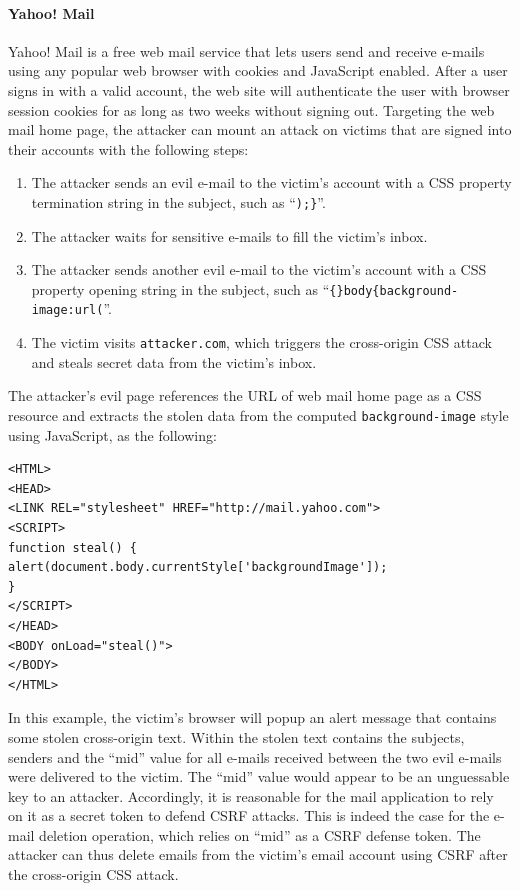 \documentclass{acm_proc_article-sp}
\begin{document}
\paragraph{Yahoo! Mail} Yahoo! Mail is a free web mail service that lets users send and receive e-mails using any popular web browser with cookies and JavaScript enabled. After a user signs in with a valid account, the web site will authenticate the user with browser session cookies for as long as two weeks without signing out. Targeting the web mail home page, the attacker can mount an attack on victims that are signed into their accounts with the following steps:
\begin{enumerate}
\item{The attacker sends an evil e-mail to the victim's account with a CSS property termination string in the subject, such as ``\texttt{);\}}''.}
\item{The attacker waits for sensitive e-mails to fill the victim's inbox.}
\item{The attacker sends another evil e-mail to the victim's account with a CSS property opening string in the subject, such as ``\texttt{\{\}body\{background-image:url(}''.}
\item{The victim visits \texttt{attacker.com}, which triggers the cross-origin CSS attack and steals secret data from the victim's inbox.}
\end{enumerate}
The attacker's evil page references the URL of web mail home page as a CSS resource and extracts the stolen data from the computed \texttt{background-image} style using JavaScript, as the following:
\begin{verbatim}
<HTML>
<HEAD>
<LINK REL="stylesheet" HREF="http://mail.yahoo.com">
<SCRIPT>
function steal() {
alert(document.body.currentStyle['backgroundImage']);
}
</SCRIPT>
</HEAD>
<BODY onLoad="steal()">
</BODY>
</HTML>
\end{verbatim}
In this example, the victim's browser will popup an alert message that contains some stolen cross-origin text. Within the stolen text contains the subjects, senders and the ``mid'' value for all e-mails received between the two evil e-mails were delivered to the victim. The ``mid'' value would appear to be an unguessable key to an attacker. Accordingly, it is reasonable for the mail application to rely on it as a secret token to defend CSRF attacks. This is indeed the case for the e-mail deletion operation, which relies on ``mid'' as a CSRF defense token. The attacker can thus delete emails from the victim's email account using CSRF after the cross-origin CSS attack.
\end{document}
